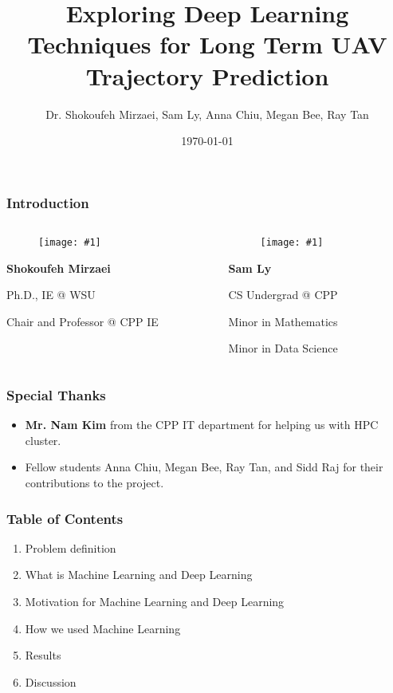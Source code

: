 \documentclass{beamer}
\title{
    Exploring Deep Learning Techniques for Long Term UAV Trajectory Prediction
}
\author{
    Dr. Shokoufeh Mirzaei, Sam Ly, Anna Chiu, Megan Bee, Ray Tan
}
\institute{Cal Poly Pomona}
\date{\today}
\newcommand{\personcard}[3]{
    \begin{minipage}{10em}
        \centering
        \begin{figure}
            \texttt{[image: \#1]}
        \end{figure}
        \textbf{#2}

        \small
        #3
    \end{minipage}%
}
\begin{document}
\begin{frame}
    \titlepage
\end{frame}

\begin{frame}
    \frametitle{Introduction}
    \centering

    \begin{columns}
        \begin{column}{10em}
            \personcard{resources/mirzaei.png}{Shokoufeh Mirzaei}{
                Ph.D., IE @ WSU

                Chair and Professor @ CPP IE
            }
        \end{column}
        
        \begin{column}{10em}
            \personcard{resources/sam.png}{Sam Ly}{
                CS Undergrad @ CPP

                Minor in Mathematics

                Minor in Data Science
            }
        \end{column}
    \end{columns}

\end{frame}

\begin{frame}
    \frametitle{Special Thanks}

    \begin{itemize}
        \item \textbf{Mr. Nam Kim} from the CPP IT department for helping us with HPC cluster.
        \item Fellow students Anna Chiu, Megan Bee, Ray Tan, and Sidd Raj for their contributions to the project.
    \end{itemize}
\end{frame}

\begin{frame}
    \frametitle{Table of Contents}

    \begin{enumerate}
        \item Problem definition
        \item What is Machine Learning and Deep Learning
        \item Motivation for Machine Learning and Deep Learning
        \item How we used Machine Learning
        \item Results
        \item Discussion
    \end{enumerate}
\end{frame}
\end{document}
